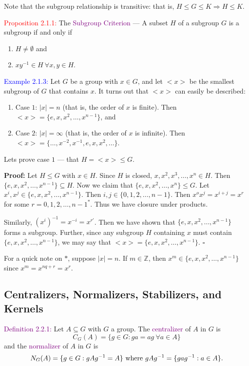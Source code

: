 \documentclass{article}
\begin{document}
Note that the subgroup relationship is transitive: that is, $H \leq G \leq K \Longrightarrow H \leq K$.

\textcolor{red}{Proposition 2.1.1:} The \textcolor{purple}{Subgroup Criterion} --- A subset $H$ of a subgroup $G$ is a subgroup if and 
only if
\begin{enumerate}
    \item $H \neq \emptyset$ and 
    \item $xy^{-1} \in H \ \forall x,y \in H$.
\end{enumerate}

\textcolor{blue}{Example 2.1.3:} Let $G$ be a group with $x \in G$, and let $<x>$ be the smallest subgroup of $G$ that contains $x$. It 
turns out that $<x>$ can easily be described:
\begin{enumerate}
    \item Case $1$: $|x| = n$ (that is, the order of $x$ is finite). Then $<x> = \{e,x,x^2, \dots, x^{n-1}\}$, and
    \item Case $2$: $|x| = \infty$ (that is, the order of $x$ is infinite). Then $<x> = \{\dots, x^{-2}, x^{-1}, e, x, x^2, \dots\}$.
\end{enumerate}
Lets prove case $1$ --- that $H = <x> \leq G$.

\textbf{Proof:} Let $H \leq G$ with $x \in H$. Since $H$ is closed, $x,x^2, x^3, \dots, x^n \in H$. Then $\{e,x,x^2, \dots, x^{n-1}\} \subseteq H$. Now we claim that $\{e,x,x^2, \dots, x^n\} \leq G$. Let $x^i, x^j \in \{e,x,x^2, \dots, x^{n-1}\}$. Then $i,j \in \{0,1,2,\dots,n-1\}$. Then $x^ox^j = x^{i+j} = x^r$ for some $r = 0,1,2, \dots, n-1^*$. Thus we have closure under products.

Similarly, $(x^i)^{-1} = x^{-i} = x^{r'}$. Then we have shown that $\{e,x,x^2, \dots, x^{n-1}\}$ forms a subgroup. Further, since any 
subgroup $H$ containing $x$ must contain $\{e,x,x^2, \dots, x^{n-1}\}$, we may say that $<x> = \{e,x,x^2, \dots, x^{n-1}\}$. $\square$

For a quick note on $*$, suppose $|x| = n$. If $m \in \mathbb{Z}$, then $x^m \in \{e,x,x^2, \dots, x^{n-1}\}$ since $x^m = x^{nq+r} = x^r$.

\subsection{Centralizers, Normalizers, Stabilizers, and Kernels}

\textcolor{purple}{Definition 2.2.1:} Let $A \subseteq G$ with $G$ a group. The \textcolor{purple}{centralizer} of $A$ in $G$ is 
\[
    C_G(A) = \{g \in G: ga=ag \ \forall a \in A\}
\]
and the \textcolor{purple}{normalizer} of $A$ in $G$ is 
\[
    N_G(A) = \{g \in G: gAg^{-1} = A\} \text{ where }\\
    gAg^{-1} = \{gag^{-1}:a \in A\}.
\]
\end{document}
